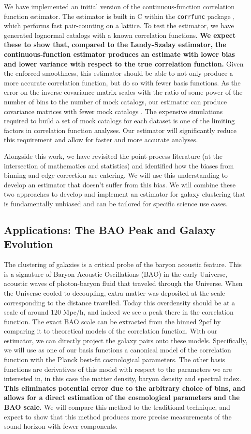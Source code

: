 \documentclass[12pt, fullpage, letterpaper]{article}
\newcommand{\cf}{2pcf\xspace}
\begin{document}
We have implemented an initial version of the continuous-function correlation function estimator.
The estimator is built in C within the \texttt{corrfunc} package \citep{Sinha2017}, which performs fast pair-counting on a lattice.
To test the estimator, we have generated lognormal catalogs with a known correlation functions. 
\textbf{We expect these to show that, compared to the Landy-Szalay
  estimator, the continuous-function estimator produces an estimate with lower bias and
  lower variance with respect to the true correlation function.}
Given the enforced smoothness, this estimator should be able to not only produce a more accurate correlation function, but do so with fewer basis functions.
As the error on the inverse covariance matrix scales with the ratio of some power of the number of bins to the number of mock catalogs, our estimator can produce covariance matrices with fewer mock catalogs \citep{Hartlap2007}.
The expensive simulations required to build a set of mock catalogs for each dataset is one of the limiting factors in correlation function analyses.
Our estimator will significantly reduce this requirement and allow for faster and more accurate analyses.

Alongside this work, we have revisited the point-process literature (at the intersection of mathematics and statistics) and identified how the biases from binning and edge correction are entering. 
We will use this understanding to develop an estimator that doesn't suffer from this bias.
We will combine these two approaches to develop and implement an estimator for galaxy clustering that is fundamentally unbiased and can be tailored for specific science use cases.

\subsection{Applications: The BAO Peak and Galaxy Evolution}

The clustering of galaxies is a critical probe of the baryon acoustic feature. 
This is a signature of Baryon Acoustic Oscillations (BAO) in the early Universe, acoustic waves of photon-baryon fluid that traveled through the Universe. 
When the Universe cooled to decoupling, extra matter was deposited at the scale corresponding to the distance travelled. 
Today this overdensity should be at a scale of around 120 Mpc/h, and indeed we see a peak there in the correlation function. 
The exact BAO scale can be extracted from the binned \cf by comparing it to theoretical models of the correlation function. 
With our estimator, we can directly project the galaxy pairs onto these models. 
Specifically, we will use as one of our basis functions a canonical model of the correlation function with the Planck best-fit cosmological parameters. 
The other basis functions are derivatives of this model with respect to the parameters we are interested in, in this case the matter density, baryon density and spectral index.
\textbf{This eliminates potential error due to the arbitrary choice of bins, and allows for a direct estimation of the cosmological parameters and the BAO scale.}
We will compare this method to the traditional technique, and expect to show that this method produces more precise measurements of the sound horizon with fewer components.
\end{document}
